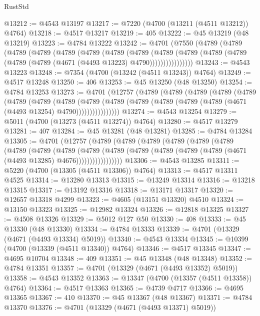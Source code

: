 \begin{lexlean}{RustStd}
\begin{coremodule}
@13212 := @4543 @13197
@13217 := @7220 (@4700 (@13211 (@4511 @13212)) @4764)
@13218 := @4517 @13217
@13219 := 405
@13222 := @45 @13219 (@48 @13219)
@13223 := @4784 @13222
@13242 := @4701
    (@7550
      (@4789
        (@4789
          (@4789
            (@4789
              (@4789
                (@4789
                  (@4789
                    (@4789
                      (@4789
                        (@4789
                          (@4789 (@4789 (@4789 (@4789 (@4671 (@4493 @13223) @4790))))))))))))))))
@13243 := @4543 @13223
@13248 := @7354 (@4700 (@13242 (@4511 @13243)) @4764)
@13249 := @4517 @13248
@13250 := 406
@13253 := @45 @13250 (@48 @13250)
@13254 := @4784 @13253
@13273 := @4701
    (@12757
      (@4789
        (@4789
          (@4789
            (@4789
              (@4789
                (@4789
                  (@4789
                    (@4789
                      (@4789
                        (@4789
                          (@4789 (@4789 (@4789 (@4789 (@4671 (@4493 @13254) @4790))))))))))))))))
@13274 := @4543 @13254
@13279 := @5011 (@4700 (@13273 (@4511 @13274)) @4764)
@13280 := @4517 @13279
@13281 := 407
@13284 := @45 @13281 (@48 @13281)
@13285 := @4784 @13284
@13305 := @4701
    (@12757
      (@4789
        (@4789
          (@4789
            (@4789
              (@4789
                (@4789
                  (@4789
                    (@4789
                      (@4789
                        (@4789
                          (@4789
                            (@4789 (@4789 (@4789 (@4789 (@4671 (@4493 @13285) @4676)))))))))))))))))
@13306 := @4543 @13285
@13311 := @5220 (@4700 (@13305 (@4511 @13306)) @4764)
@13313 := @4517 @13311 @4525
@13314 := @13280 @13313
@13315 := @13249 @13314
@13316 := @13218 @13315
@13317 := @13192 @13316
@13318 := @13171 @13317
@13320 := @12657 @13318 @4299
@13323 := @4605 (@13151 @13320) @4510
@13324 := @13150 @13323
@13325 := @12982 @13324
@13326 := @12818 @13325
@13327 := @4508 @13326
@13329 := @5012 @127 @50
@13330 := 408
@13333 := @45 @13330 (@48 @13330)
@13334 := @4784 @13333
@13339 := @4701 (@13329 (@4671 (@4493 @13334) @5019))
@13340 := @4543 @13334
@13345 := @10399 (@4700 (@13339 (@4511 @13340)) @4764)
@13346 := @4517 @13345
@13347 := @4695 @10704
@13348 := 409
@13351 := @45 @13348 (@48 @13348)
@13352 := @4784 @13351
@13357 := @4701 (@13329 (@4671 (@4493 @13352) @5019))
@13358 := @4543 @13352
@13363 := @13347 (@4700 (@13357 (@4511 @13358)) @4764)
@13364 := @4517 @13363
@13365 := @4739 @4717
@13366 := @4695 @13365
@13367 := 410
@13370 := @45 @13367 (@48 @13367)
@13371 := @4784 @13370
@13376 := @4701 (@13329 (@4671 (@4493 @13371) @5019))

\end{coremodule}
\end{lexlean}
